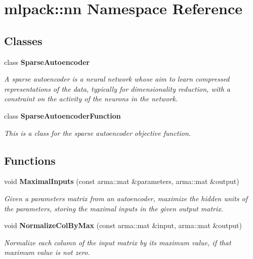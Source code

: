 \section{mlpack\+:\+:nn Namespace Reference}
\label{namespacemlpack_1_1nn}
\subsection*{Classes}
\begin{DoxyCompactItemize}
\item 
class \textbf{ Sparse\+Autoencoder}
\begin{DoxyCompactList}\small\item\em A sparse autoencoder is a neural network whose aim to learn compressed representations of the data, typically for dimensionality reduction, with a constraint on the activity of the neurons in the network. \end{DoxyCompactList}\item 
class \textbf{ Sparse\+Autoencoder\+Function}
\begin{DoxyCompactList}\small\item\em This is a class for the sparse autoencoder objective function. \end{DoxyCompactList}\end{DoxyCompactItemize}
\subsection*{Functions}
\begin{DoxyCompactItemize}
\item 
void \textbf{ Maximal\+Inputs} (const arma\+::mat \&parameters, arma\+::mat \&output)
\begin{DoxyCompactList}\small\item\em Given a parameters matrix from an autoencoder, maximize the hidden units of the parameters, storing the maximal inputs in the given output matrix. \end{DoxyCompactList}\item 
void \textbf{ Normalize\+Col\+By\+Max} (const arma\+::mat \&input, arma\+::mat \&output)
\begin{DoxyCompactList}\small\item\em Normalize each column of the input matrix by its maximum value, if that maximum value is not zero. \end{DoxyCompactList}\end{DoxyCompactItemize}


